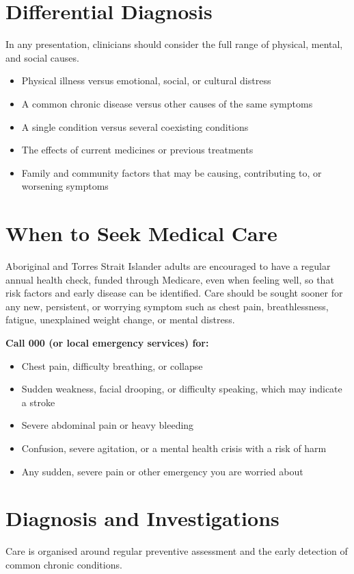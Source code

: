 \section*{Differential Diagnosis}
In any presentation, clinicians should consider the full range of physical, mental, and social causes.

\begin{itemize}
    \item Physical illness versus emotional, social, or cultural distress
    \item A common chronic disease versus other causes of the same symptoms
    \item A single condition versus several coexisting conditions
    \item The effects of current medicines or previous treatments
    \item Family and community factors that may be causing, contributing to, or worsening symptoms
\end{itemize}

\section*{When to Seek Medical Care}
Aboriginal and Torres Strait Islander adults are encouraged to have a regular annual health check, funded through Medicare, even when feeling well, so that risk factors and early disease can be identified. Care should be sought sooner for any new, persistent, or worrying symptom such as chest pain, breathlessness, fatigue, unexplained weight change, or mental distress.

\textbf{Call 000 (or local emergency services) for:}
\begin{itemize}
    \item Chest pain, difficulty breathing, or collapse
    \item Sudden weakness, facial drooping, or difficulty speaking, which may indicate a stroke
    \item Severe abdominal pain or heavy bleeding
    \item Confusion, severe agitation, or a mental health crisis with a risk of harm
    \item Any sudden, severe pain or other emergency you are worried about
\end{itemize}

\section*{Diagnosis and Investigations}
Care is organised around regular preventive assessment and the early detection of common chronic conditions.

